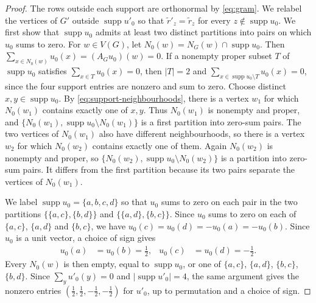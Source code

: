 \documentclass[11pt,a4paper]{article}
\theoremstyle{plain}
\theoremstyle{definition}
\DeclareMathOperator{\supp}{supp}
\begin{document}
\begin{proof}
  The rows outside each support are orthonormal by \cref{eq:gram}.
  We relabel the vertices of $G'$ outside $\supp u'_0$ so that
  $\tilde{r}'_z=\tilde{r}_z$ for every $z\notin\supp u_0$.
  We first show that $\supp u_0$ admits at least two distinct
  partitions into pairs on which $u_0$ sums to zero.
  For $w\in V(G)$, let $N_0(w)=N_G(w)\cap\supp u_0$.
  Then $\sum_{x\in N_0(w)}u_0(x)=(A_Gu_0)(w)=0$.
  If a nonempty proper subset $T$ of $\supp u_0$ satisfies
  $\sum_{x\in T}u_0(x)=0$, then $|T|=2$ and
  $\sum_{x\in\supp u_0\setminus T}u_0(x)=0$, since the four support
  entries are nonzero and sum to zero.
  Choose distinct $x,y\in\supp u_0$.
  By \cref{eq:support-neighbourhoods}, there is a vertex $w_1$ for which
  $N_0(w_1)$ contains exactly one of $x,y$.
  Thus $N_0(w_1)$ is nonempty and proper, and
  $\{N_0(w_1),\supp u_0\setminus N_0(w_1)\}$ is a first partition
  into zero-sum pairs.
  The two vertices of $N_0(w_1)$ also have different neighbourhoods,
  so there is a vertex $w_2$ for which $N_0(w_2)$ contains exactly
  one of them. Again $N_0(w_2)$ is nonempty and proper, so
  $\{N_0(w_2),\supp u_0\setminus N_0(w_2)\}$ is a partition into
  zero-sum pairs. It differs from the first partition because its
  two pairs separate the vertices of $N_0(w_1)$.

  We label $\supp u_0=\{a,b,c,d\}$ so that $u_0$ sums to zero
  on each pair in the two partitions
  $\{\{a,c\},\{b,d\}\}$ and $\{\{a,d\},\{b,c\}\}$.
  Since $u_0$ sums to zero on each of $\{a,c\}$, $\{a,d\}$ and
  $\{b,c\}$, we have
  $u_0(c)=u_0(d)=-u_0(a)=-u_0(b)$.
  Since $u_0$ is a unit vector, a choice of sign gives
  \begin{equation}
    \label{eq:support4}
    \begin{aligned}
      u_0(a)&=u_0(b)=\frac12, &
      u_0(c)&=u_0(d)=-\frac12.
    \end{aligned}
  \end{equation}
  Every $N_0(w)$ is then empty, equal to $\supp u_0$, or one of
  $\{a,c\}$, $\{a,d\}$, $\{b,c\}$, $\{b,d\}$.
  Since $\sum_yu'_0(y)=0$ and $|\supp u'_0|=4$, the same argument
  gives the nonzero entries $(\tfrac12,\tfrac12,-\tfrac12,-\tfrac12)$
  for $u'_0$, up to permutation and a choice of sign.


\end{proof}
\end{document}

